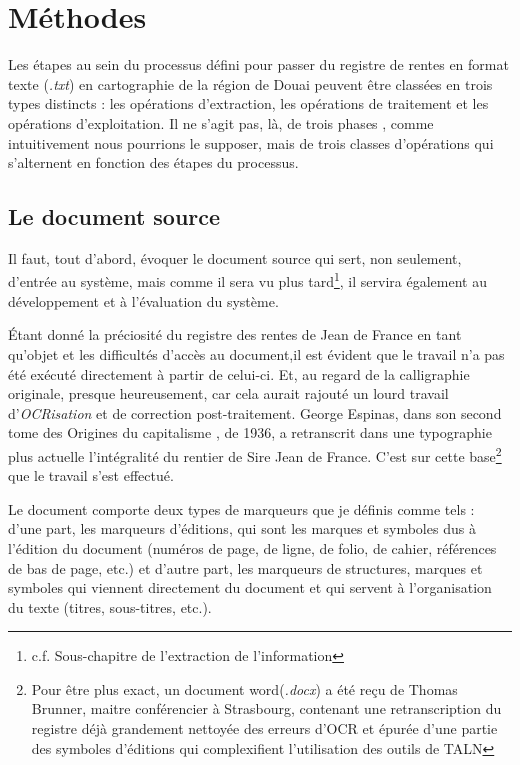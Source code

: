 \chapter{Méthodes}
Les étapes au sein du processus défini pour passer du registre de rentes en format texte (\textit{.txt}) en cartographie de la région de Douai peuvent être classées en trois types distincts : les opérations d’extraction, les opérations de traitement et les opérations d’exploitation. Il ne s’agit pas, là, de trois phases , comme intuitivement nous pourrions le supposer, mais de trois classes d'opérations qui s’alternent en fonction des étapes du processus.

\section{Le document source}
Il faut, tout d'abord, évoquer le document source qui sert, non seulement, d'entrée au système, mais comme  il sera vu plus tard\footnote{c.f. Sous-chapitre de l'extraction de l'information}, il servira également au développement et à l'évaluation du système.

Étant donné la préciosité  du registre des rentes de Jean de France en tant qu'objet et les difficultés d'accès au document,il est évident que le travail n'a pas été exécuté directement à partir de celui-ci. Et, au regard de la calligraphie originale, presque heureusement, car cela aurait rajouté un lourd travail d'\textit{OCRisation} et de correction post-traitement. 
George Espinas, dans son second tome des \og Origines du capitalisme \fg , de 1936, a retranscrit dans une typographie plus actuelle l'intégralité du rentier de Sire Jean de France. C'est sur cette base\footnote{Pour être plus exact, un document word(\textit{.docx}) a été reçu de Thomas Brunner, maitre conférencier à Strasbourg, contenant une retranscription du registre déjà  grandement nettoyée des erreurs d'OCR et épurée d'une partie des symboles d'éditions qui complexifient l'utilisation des  outils de TALN} que le travail s'est effectué.

Le document comporte deux types de marqueurs que je définis comme tels : d'une part, les marqueurs d'éditions, qui sont les marques et symboles dus à l'édition du document (numéros de page, de ligne, de folio, de cahier, références de bas de page, etc.) et d'autre part, les marqueurs de structures, marques et symboles qui viennent directement du document et qui servent à l'organisation du texte (titres, sous-titres, etc.).

